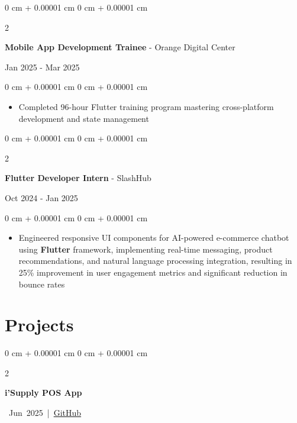 \documentclass[10pt, letterpaper]{article}
\newenvironment{highlights}{
\begin{itemize}[
topsep=0.10 cm,
parsep=0.10 cm,
partopsep=0pt,
itemsep=0pt,
leftmargin=0 cm + 10pt
]
}{
\end{itemize}
} %
\newenvironment{onecolentry}{
\begin{adjustwidth}{
0 cm + 0.00001 cm
}{
0 cm + 0.00001 cm
}
}{
\end{adjustwidth}
} %
\newenvironment{twocolentry}[2][]{
\onecolentry
\def\secondColumn{#2}
\setcolumnwidth{\fill, 4.5 cm}
\begin{paracol}{2}
}{
\switchcolumn \raggedleft \secondColumn
\end{paracol}
\endonecolentry
} %
\let\hrefWithoutArrow\href
\begin{document}
\begin{twocolentry}{
Jan 2025 - Mar 2025
}
\textbf{\large Mobile App Development Trainee} - Orange Digital Center
\end{twocolentry}
\vspace{0.1 cm}
\begin{onecolentry}
\begin{highlights}
\item Completed 96-hour Flutter training program mastering cross-platform development and state management
\end{highlights}
\end{onecolentry}

\vspace{0.2 cm}

\begin{twocolentry}{
Oct 2024 - Jan 2025
}
\textbf{\large Flutter Developer Intern} - SlashHub
\end{twocolentry}
\vspace{0.1 cm}
\begin{onecolentry}
\begin{highlights}
\item Engineered responsive UI components for AI-powered e-commerce chatbot using \textbf{Flutter} framework, implementing real-time messaging, product recommendations, and natural language processing integration, resulting in 25\% improvement in user engagement metrics and significant reduction in bounce rates
\end{highlights}
\end{onecolentry}

\newpage


\section{Projects}

\vspace{0.10 cm}

\begin{twocolentry}{
\mbox{
Jun 2025 | \hrefWithoutArrow{https://github.com/KarimmYasser/isupply_app}{GitHub}}%
}
\textbf{i'Supply POS App}
\end{twocolentry}

\vspace{0.20 cm}
\end{document}
